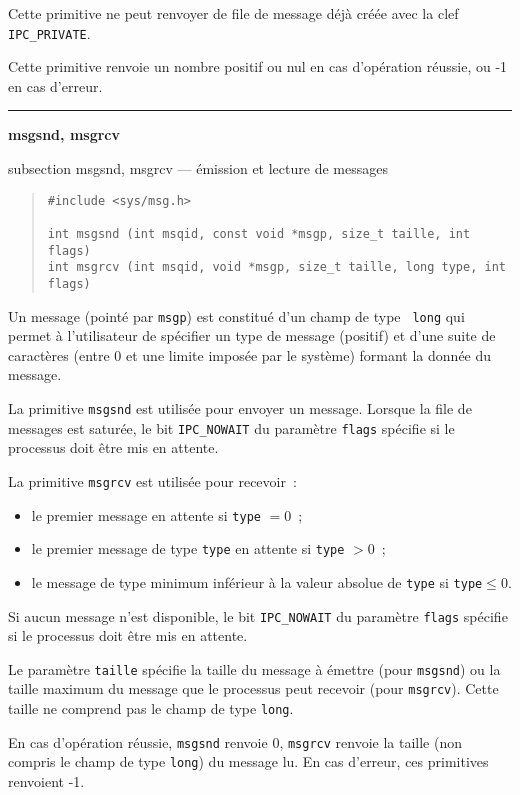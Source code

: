 \documentclass [twoside] {report}
\newcommand {\primitive} [1]
    {
	{\large \bf #1}
	\addcontentsline {toc} {subsection} {#1}
    }
\newcommand {\separation}
    {
	\vspace {7mm}
	\nopagebreak
	\hrule
    }
\begin{document}
Cette primitive ne peut renvoyer de file de message déjà créée avec la
clef {\tt IPC\_PRIVATE}.

Cette primitive renvoie un nombre positif ou nul en cas d'opération
réussie, ou -1 en cas d'erreur.


\separation
\primitive {msgsnd, msgrcv} --- émission et lecture de messages

\begin {quote}
\begin {verbatim}
#include <sys/msg.h>

int msgsnd (int msqid, const void *msgp, size_t taille, int flags)
int msgrcv (int msqid, void *msgp, size_t taille, long type, int flags)
\end{verbatim}
\end {quote}

Un message (pointé par {\tt msgp}) est constitué d'un champ de type {\tt
long} qui permet à l'utilisateur de spécifier un type de message
(positif) et d'une suite de caractères (entre 0 et une limite imposée
par le système) formant la donnée du message.

La primitive {\tt msgsnd} est utilisée pour envoyer un message.  Lorsque
la file de messages est saturée, le bit {\tt IPC\_NOWAIT} du paramètre
{\tt flags} spécifie si le processus doit être mis en attente.

La primitive {\tt msgrcv} est utilisée pour recevoir~:

\begin {itemize}
    \item le premier message en attente si {\tt type} $= 0$~;
    \item le premier message de type {\tt type} en attente si {\tt type}
	$> 0$~;
    \item le message de type minimum inférieur à la valeur absolue de
	{\tt type} si {\tt type}$\leq 0$.
\end {itemize}

Si aucun message n'est disponible, le bit {\tt IPC\_NOWAIT} du paramètre
{\tt flags} spécifie si le processus doit être mis en attente.

Le paramètre {\tt taille} spécifie la taille du message à émettre (pour
{\tt msgsnd}) ou la taille maximum du message que le processus peut
recevoir (pour {\tt msgrcv}).  Cette taille ne comprend pas le champ de
type {\tt long}.

En cas d'opération réussie, {\tt msgsnd} renvoie 0, {\tt msgrcv} renvoie
la taille (non compris le champ de type {\tt long}) du message lu.
En cas d'erreur, ces primitives renvoient -1.
\end{document}

